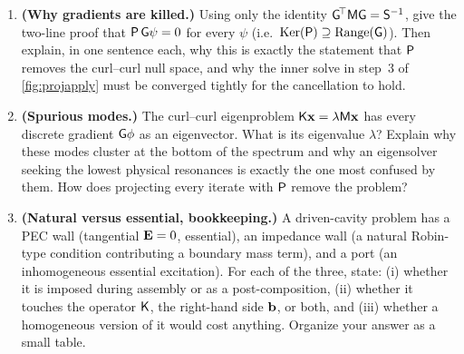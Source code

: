 \begin{enumerate}[nosep]
  \item \textbf{(Why gradients are killed.)} Using only the identity
  $\mathsf{G}^{\!\top}\mathsf{M}\mathsf{G}=\mathsf{S}^{-1}$, give the two-line proof that
  $\mathsf{P}\,\mathsf{G}\psi=0$ for every $\psi$ (i.e.\
  $\mathrm{Ker}(\mathsf{P})\supseteq\mathrm{Range}(\mathsf{G})$). Then explain, in one
  sentence each, why this is exactly the statement that $\mathsf{P}$ removes the
  curl--curl null space, and why the inner solve in step~3 of
  \cref{fig:projapply} must be converged tightly for the cancellation to hold.

  \item \textbf{(Spurious modes.)} The curl--curl eigenproblem
  $\mathsf{K}\mathbf{x}=\lambda\mathsf{M}\mathbf{x}$ has every discrete gradient $\mathsf{G}\phi$ as an
  eigenvector. What is its eigenvalue $\lambda$? Explain why these modes cluster at
  the bottom of the spectrum and why an eigensolver seeking the lowest physical
  resonances is exactly the one most confused by them. How does projecting every
  iterate with $\mathsf{P}$ remove the problem?

  \item \textbf{(Natural versus essential, bookkeeping.)} A driven-cavity problem
  has a PEC wall (tangential $\mathbf{E}=0$, essential), an impedance wall (a natural
  Robin-type condition contributing a boundary mass term), and a port (an
  inhomogeneous essential excitation). For each of the three, state: (i) whether it
  is imposed during assembly or as a post-composition, (ii) whether it touches the
  operator $\mathsf{K}$, the right-hand side $\mathbf{b}$, or both, and (iii) whether a
  homogeneous version of it would cost anything. Organize your answer as a small
  table.
\end{enumerate}

